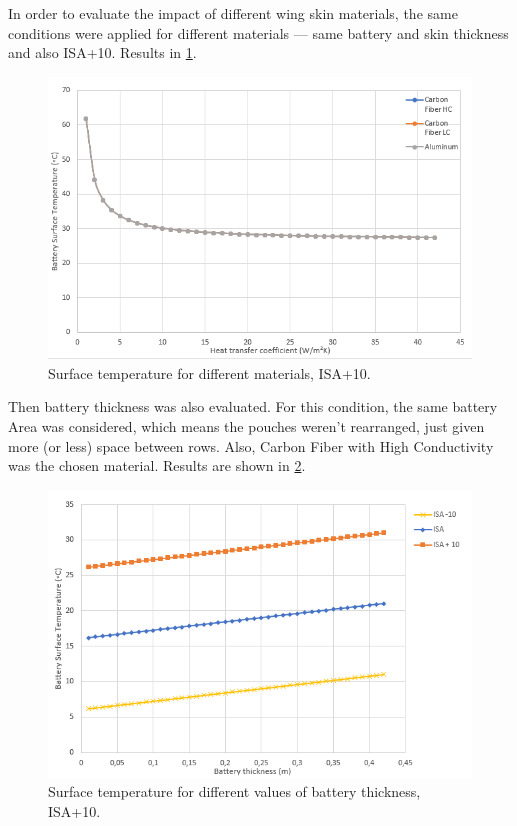In order to evaluate the impact of different wing skin materials, the same conditions were applied for different materials --- same battery and skin thickness and also ISA+10. Results in \cref{fig:materials}.
\begin{figure}
    \centering
    \includegraphics[width=\textwidth]{fig/materials.png}
    \caption{Surface temperature for different materials, ISA+10.}
    \label{fig:materials}
\end{figure}

Then battery thickness was also evaluated. For this condition, the same battery Area was considered, which means the pouches weren't rearranged, just given more (or less) space between rows.
Also, Carbon Fiber with High Conductivity was the chosen material. Results are shown in \cref{fig:bathick}.
\begin{figure}
    \centering
    \includegraphics[width=\textwidth]{fig/bathick.png}
    \caption{Surface temperature for different values of battery thickness, ISA+10.}
    \label{fig:bathick}
\end{figure}



